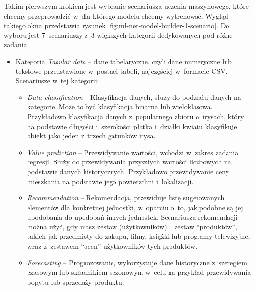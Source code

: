 Takim pierwszym krokiem jest wybranie scenariusza uczenia maszynowego, które chcemy przeprowadzić w~dla którego modelu chcemy wytrenować.
Wygląd takiego okna przedstawia \hyperref[fig:ml-net-model-builder-1-scenario]{rysunek \ref*{fig:ml-net-model-builder-1-scenario}}.
Do wyboru jest 7~scenariuszy z~3 większych kategorii dedykowanych pod różne zadania:

\begin{itemize}

  \item Kategoria \emph{Tabular data} -- dane tabelaryczne, czyli dane numeryczne lub tekstowe przedstawione w~postaci tabeli, najczęściej w~formacie CSV.
        Scenariusze w~tej kategorii:

        \begin{itemize}

          \item \emph{Data classification} -- Klasyfikacja danych, służy do podziału danych na kategorie.
                Może to być klasyfikacja binarna lub wieloklasowa.
                Przykładowo klasyfikacja danych z~popularnego zbioru o~irysach, który na podstawie długości i~szerokości płatka i~działki kwiatu klasyfikuje obiekt jako jeden z~trzech gatunków irysa.

          \item \emph{Value prediction} -- Przewidywanie wartości, wchodzi w~zakres zadania regresji.
                Służy do przewidywania przyszłych wartości liczbowych na podstawie danych historycznych.
                Przykładowo przewidywanie ceny mieszkania na podstawie jego powierzchni i~lokalizacji.

          \item \emph{Recommendation} -- Rekomendacja, przewiduje listę sugerowanych elementów dla konkretnej jednostki, w~oparciu o~to, jak podobne są jej upodobania do upodobań innych jednostek.
          Scenariusza rekomendacji można użyć, gdy masz zestaw  (użytkowników) i~zestaw ``produktów'', takich jak przedmioty do zakupu, filmy, książki lub programy telewizyjne, wraz z~zestawem ``ocen'' użytkowników tych produktów.

          \item \emph{Forecasting} -- Prognozowanie, wykorzystuje dane historyczne z~szeregiem czasowym lub składnikiem sezonowym w~celu na przykład przewidywania popytu lub sprzedaży produktu.

        \end{itemize}


\end{itemize}
